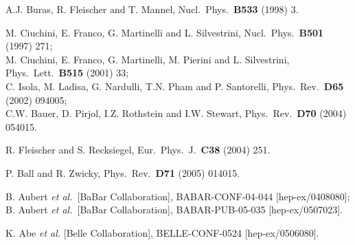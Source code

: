 \documentclass[11pt]{cernrep}
\begin{document}
\begin{thebibliography}{999}
A.J. Buras, R. Fleischer and T. Mannel,
{ Nucl.\ Phys.}~{\bf B533} (1998) 3.

M. Ciuchini, E. Franco, G. Martinelli and L. Silvestrini,
  { Nucl.\ Phys.}~{\bf B501} (1997) 271;\\
M. Ciuchini, E. Franco, G. Martinelli, M. Pierini 
and L. Silvestrini,
{ Phys.\ Lett.}~{\bf B515} (2001) 33;\\
C. Isola, M. Ladisa, G. Nardulli, T.N. Pham and P. Santorelli,
{ Phys.\ Rev.}~{\bf D65} (2002) 094005;\\
C.W. Bauer, D. Pirjol, I.Z. Rothstein and I.W. Stewart,
 { Phys.\ Rev.}~{\bf D70} (2004) 054015.

R. Fleischer and S. Recksiegel,
  { Eur.\ Phys.\ J.}~{\bf C38} (2004) 251.

P. Ball and R. Zwicky,
  { Phys.\ Rev}.~{\bf D71} (2005) 014015.

B. Aubert {\it et al.}\  [BaBar Collaboration],
 BABAR-CONF-04-044 [hep-ex/0408080];\\
   B. Aubert {\it et al.}\  [BaBar Collaboration],
  BABAR-PUB-05-035 [hep-ex/0507023].

K. Abe {\it et al.}  [Belle Collaboration],
  BELLE-CONF-0524 [hep-ex/0506080].


\end{thebibliography}
\end{document}
